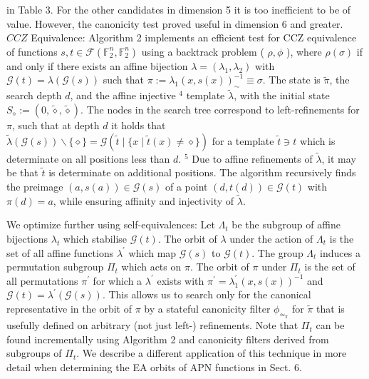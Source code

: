 \documentclass[10pt]{article}
\begin{document}
in Table 3. For the other candidates in dimension 5 it is too inefficient to be of value. However, the canonicity test proved useful in dimension 6 and greater.\\
$C C Z$ Equivalence: Algorithm 2 implements an efficient test for CCZ equivalence of functions $s, t \in \mathcal{F}\left(\mathbb{F}_{2}^{n}, \mathbb{F}_{2}^{n}\right)$ using a backtrack problem ( $\rho, \phi$ ), where $\rho(\sigma)$ if and only if there exists an affine bijection $\lambda=\left(\lambda_{1}, \lambda_{2}\right)$ with $\mathcal{G}(t)=\lambda(\mathcal{G}(s))$ such that $\pi:=\lambda_{1}(x, s(x))_{\sim}^{-1} \equiv \sigma$. The state is $\tilde{\pi}$, the search depth $d$, and the affine injective ${ }^{4}$ template $\tilde{\lambda}$, with the initial state $S_{\diamond}:=(0, \tilde{\diamond}, \tilde{\diamond})$. The nodes in the search tree correspond to left-refinements for $\pi$, such that at depth $d$ it holds that $\tilde{\lambda}(\mathcal{G}(s)) \backslash\{\diamond\}=\mathcal{G}(\tilde{t} \mid\{x \mid \tilde{t}(x) \neq \diamond\})$ for a template $\tilde{t} \ni t$ which is determinate on all positions less than $d$. ${ }^{5}$ Due to affine refinements of $\tilde{\lambda}$, it may be that $\tilde{t}$ is determinate on additional positions. The algorithm recursively finds the preimage $(a, s(a)) \in \mathcal{G}(s)$ of a point $(d, t(d)) \in \mathcal{G}(t)$ with $\pi(d)=a$, while ensuring affinity and injectivity of $\tilde{\lambda}$.

We optimize further using self-equivalences: Let $\Lambda_{t}$ be the subgroup of affine bijections $\lambda_{t}$ which stabilise $\mathcal{G}(t)$. The orbit of $\lambda$ under the action of $\Lambda_{t}$ is the set of all affine functions $\lambda^{\prime}$ which map $\mathcal{G}(s)$ to $\mathcal{G}(t)$. The group $\Lambda_{t}$ induces a permutation subgroup $\Pi_{t}$ which acts on $\pi$. The orbit of $\pi$ under $\Pi_{t}$ is the set of all permutations $\pi^{\prime}$ for which a $\lambda^{\prime}$ exists with $\pi^{\prime}=\lambda_{1}^{\prime}(x, s(x))^{-1}$ and $\mathcal{G}(t)=\lambda^{\prime}(\mathcal{G}(s))$. This allows us to search only for the canonical representative in the orbit of $\pi$ by a stateful canonicity filter $\phi_{\simeq_{\pi}}$ for $\tilde{\pi}$ that is usefully defined on arbitrary (not just left-) refinements. Note that $\Pi_{t}$ can be found incrementally using Algorithm 2 and canonicity filters derived from subgroups of $\Pi_{t}$. We describe a different application of this technique in more detail when determining the EA orbits of APN functions in Sect. 6.
\end{document}
